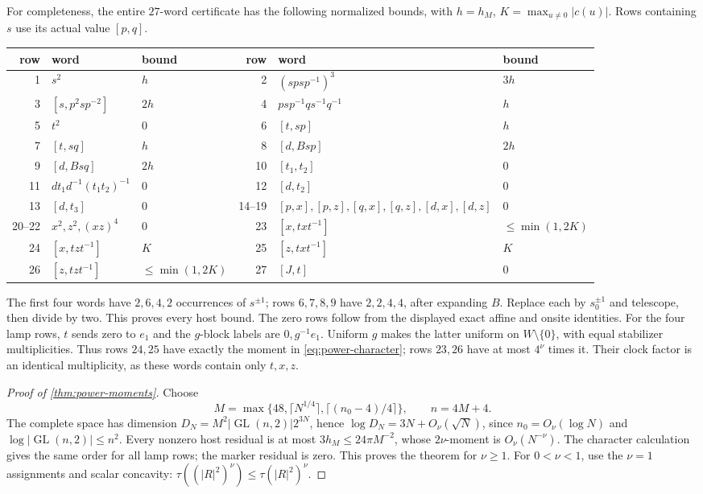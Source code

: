 For completeness, the entire $27$-word certificate has the following normalized bounds, with $h=h_M$, $K=\max_{u\ne0}|c(u)|$. Rows containing $s$ use its actual value $[p,q]$.
\begin{center}\small\setlength{\tabcolsep}{3pt}
\begin{tabular}{rll@{\qquad}rll}
\toprule
row & word & bound & row & word & bound\\\midrule
1 &$s^2$ &$h$& 2 &$(spsp^{-1})^3$ &$3h$\\
3 &$[s,p^2sp^{-2}]$ &$2h$&4 &$psp^{-1}qs^{-1}q^{-1}$ &$h$\\
5 &$t^2$ &$0$&6 &$[t,sp]$ &$h$\\
7 &$[t,sq]$ &$h$&8 &$[d,Bsp]$ &$2h$\\
9 &$[d,Bsq]$ &$2h$&10 &$[t_1,t_2]$ &$0$\\
11 &$dt_1d^{-1}(t_1t_2)^{-1}$ &$0$&12 &$[d,t_2]$ &$0$\\
13 &$[d,t_3]$ &$0$&14--19 &$[p,x],[p,z],[q,x],[q,z],[d,x],[d,z]$ &$0$\\
20--22 &$x^2,z^2,(xz)^4$ &$0$&23 &$[x,txt^{-1}]$ &$\le\min(1,2K)$\\
24 &$[x,tzt^{-1}]$ &$K$&25 &$[z,txt^{-1}]$ &$K$\\
26 &$[z,tzt^{-1}]$ &$\le\min(1,2K)$&27 &$[J,t]$ &$0$\\\bottomrule
\end{tabular}
\end{center}
The first four words have $2,6,4,2$ occurrences of $s^{\pm1}$; rows $6,7,8,9$ have $2,2,4,4$, after expanding $B$. Replace each by $s_0^{\pm1}$ and telescope, then divide by two. This proves every host bound. The zero rows follow from the displayed exact affine and onsite identities. For the four lamp rows, $t$ sends zero to $e_1$ and the $g$-block labels are $0,g^{-1}e_1$. Uniform $g$ makes the latter uniform on $W\setminus\{0\}$, with equal stabilizer multiplicities. Thus rows $24,25$ have exactly the moment in \eqref{eq:power-character}; rows $23,26$ have at most $4^\nu$ times it. Their clock factor is an identical multiplicity, as these words contain only $t,x,z$.

\begin{proof}[Proof of \cref{thm:power-moments}]
Choose
\[
 M=\max\{48,\lceil N^{1/4}\rceil,\lceil(n_0-4)/4\rceil\},\qquad n=4M+4.
\]
The complete space has dimension $D_N=M^2|\operatorname{GL}(n,2)|2^{3N}$, hence
$\log D_N=3N+O_\nu(\sqrt N)$, since $n_0=O_\nu(\log N)$ and $\log|\operatorname{GL}(n,2)|\le n^2$. Every nonzero host residual is at most $3h_M\le24\pi M^{-2}$, whose $2\nu$-moment is $O_\nu(N^{-\nu})$. The character calculation gives the same order for all lamp rows; the marker residual is zero. This proves the theorem for $\nu\ge1$. For $0<\nu<1$, use the $\nu=1$ assignments and scalar concavity:
$\tau((|R|^2)^\nu)\le\tau(|R|^2)^\nu$.
\end{proof}


